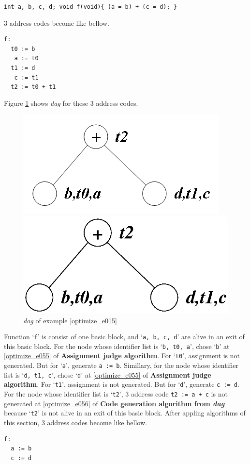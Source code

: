 \begin{Example}
\label{optimize_e015}
\begin{verbatim}
int a, b, c, d; void f(void){ (a = b) + (c = d); }
\end{verbatim}
3 address codes become like bellow.
\begin{verbatim}
f:
  t0 := b
   a := t0
  t1 := d
   c := t1
  t2 := t0 + t1
\end{verbatim}
Figure \ref{optimize_e016} shows {\em dag} for these 3 address codes.
\begin{figure}[htbp]
\begin{center}
\begin{htmlonly}
\includegraphics[width=0.7\linewidth,height=0.362\linewidth]{opt005.png}
\end{htmlonly}
\begin{latexonly}
\includegraphics[width=0.7\linewidth,height=0.362\linewidth]{opt005.eps}
\end{latexonly}
\caption{{\em dag} of example \ref{optimize_e015}}
\label{optimize_e016}
\end{center}
\end{figure}
Function `{\tt{f}}' is consist of one basic block, and 
`{\tt{a, b, c, d}}' are alive in an exit of this basic block.
For the node whose identifier list is `{\tt{b, t0, a}}',
chose `{\tt{b}}' at \ref{optimize_e055} of {\bf Assignment judge
 algorithm}. For `{\tt{t0}}', assignment is not generated.
But for `{\tt{a}}', generate {\tt{a := b}}.
Simillary, for the node whose identifier list is `{\tt{d, t1, c}}',
chose `{\tt{d}}' at \ref{optimize_e055} of {\bf Assignment judge
 algorithm}. For `{\tt{t1}}', assignment is not generated.
But for `{\tt{d}}', generate {\tt{c := d}}.
For the node whose identifier list is `{\tt{t2}}',
3 address code {\tt{t2 := a + c}} is not generated
at \ref{optimize_e056} of {\bf Code generation algorithm from {\em dag}}
because `{\tt{t2}}' is not alive in an exit of this basic block.
After appling algorithms of this section,
3 address codes become like bellow.
\begin{verbatim}
f:
  a := b
  c := d
\end{verbatim}
\end{Example}

